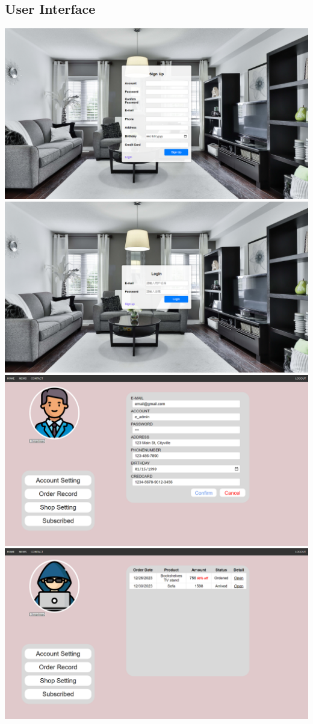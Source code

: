 \documentclass[a4paper, 12pt]{article}
\begin{document}
\subsection{User Interface}
\begin{center}
\includegraphics[scale=0.3]{ui/signup.png}
\includegraphics[scale=0.3]{ui/login.png}
\includegraphics[scale=0.3]{ui/accountSettingAll.png}
\includegraphics[scale=0.3]{ui/accountSettingOrder.png}

\end{center}
\end{document}
